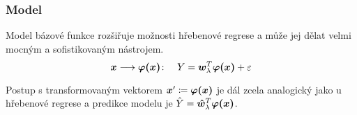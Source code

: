 \documentclass[../main.tex]{subfiles}
\begin{document}
\subsubsection{Model}
Model bázové funkce rozšiřuje možnosti hřebenové regrese a může jej dělat velmi mocným a sofistikovaným nástrojem.
\[\bm{x} \longrightarrow \bm{\varphi(\bm{x})} \colon \quad Y = \bm{w}_\lambda^T\bm{\varphi(\bm{x})} + \varepsilon\]

Postup s transformovaným vektorem $\bm{x}' \coloneqq \bm{\varphi(\bm{x})}$ je dál zcela analogický jako u hřebenové regrese a predikce modelu je $\hat{Y} = \bm{\hat{w}}_\lambda^T\bm{\varphi(\bm{x})}$.
\end{document}
